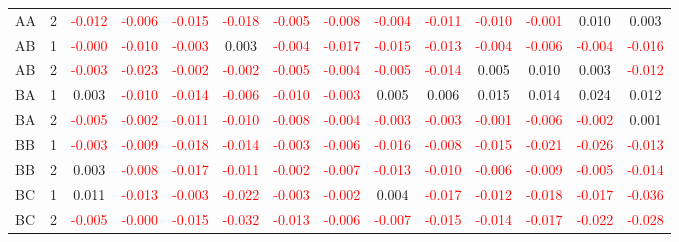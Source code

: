 \begin{table}[!htb]
{\begin{tabular}{llcccccccccccc}
AA & 2 & \textcolor{red}{-0.012} & \textcolor{red}{-0.006} & \textcolor{red}{-0.015} & \textcolor{red}{-0.018} & \textcolor{red}{-0.005} & \textcolor{red}{-0.008} & \textcolor{red}{-0.004} & \textcolor{red}{-0.011} & \textcolor{red}{-0.010} & \textcolor{red}{-0.001} & 0.010 & 0.003\\
AB & 1 & \textcolor{red}{-0.000} & \textcolor{red}{-0.010} & \textcolor{red}{-0.003} & 0.003 & \textcolor{red}{-0.004} & \textcolor{red}{-0.017} & \textcolor{red}{-0.015} & \textcolor{red}{-0.013} & \textcolor{red}{-0.004} & \textcolor{red}{-0.006} & \textcolor{red}{-0.004} & \textcolor{red}{-0.016}\\
AB & 2 & \textcolor{red}{-0.003} & \textcolor{red}{-0.023} & \textcolor{red}{-0.002} & \textcolor{red}{-0.002} & \textcolor{red}{-0.005} & \textcolor{red}{-0.004} & \textcolor{red}{-0.005} & \textcolor{red}{-0.014} & 0.005 & 0.010 & 0.003 & \textcolor{red}{-0.012}\\
BA & 1 & 0.003 & \textcolor{red}{-0.010} & \textcolor{red}{-0.014} & \textcolor{red}{-0.006} & \textcolor{red}{-0.010} & \textcolor{red}{-0.003} & 0.005 & 0.006 & 0.015 & 0.014 & 0.024 & 0.012\\
BA & 2 & \textcolor{red}{-0.005} & \textcolor{red}{-0.002} & \textcolor{red}{-0.011} & \textcolor{red}{-0.010} & \textcolor{red}{-0.008} & \textcolor{red}{-0.004} & \textcolor{red}{-0.003} & \textcolor{red}{-0.003} & \textcolor{red}{-0.001} & \textcolor{red}{-0.006} & \textcolor{red}{-0.002} & 0.001\\
BB & 1 & \textcolor{red}{-0.003} & \textcolor{red}{-0.009} & \textcolor{red}{-0.018} & \textcolor{red}{-0.014} & \textcolor{red}{-0.003} & \textcolor{red}{-0.006} & \textcolor{red}{-0.016} & \textcolor{red}{-0.008} & \textcolor{red}{-0.015} & \textcolor{red}{-0.021} & \textcolor{red}{-0.026} & \textcolor{red}{-0.013}\\
BB & 2 & 0.003 & \textcolor{red}{-0.008} & \textcolor{red}{-0.017} & \textcolor{red}{-0.011} & \textcolor{red}{-0.002} & \textcolor{red}{-0.007} & \textcolor{red}{-0.013} & \textcolor{red}{-0.010} & \textcolor{red}{-0.006} & \textcolor{red}{-0.009} & \textcolor{red}{-0.005} & \textcolor{red}{-0.014}\\
BC & 1 & 0.011 & \textcolor{red}{-0.013} & \textcolor{red}{-0.003} & \textcolor{red}{-0.022} & \textcolor{red}{-0.003} & \textcolor{red}{-0.002} & 0.004 & \textcolor{red}{-0.017} & \textcolor{red}{-0.012} & \textcolor{red}{-0.018} & \textcolor{red}{-0.017} & \textcolor{red}{-0.036}\\
BC & 2 & \textcolor{red}{-0.005} & \textcolor{red}{-0.000} & \textcolor{red}{-0.015} & \textcolor{red}{-0.032} & \textcolor{red}{-0.013} & \textcolor{red}{-0.006} & \textcolor{red}{-0.007} & \textcolor{red}{-0.015} & \textcolor{red}{-0.014} & \textcolor{red}{-0.017} & \textcolor{red}{-0.022} & \textcolor{red}{-0.028}\\

\end{tabular}}
\end{table}

